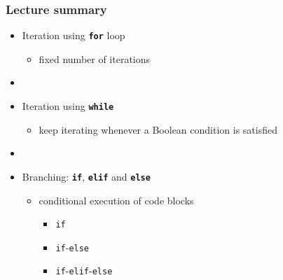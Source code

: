 \documentclass[english,14pt]{beamer}
\begin{document}
\begin{frame}[fragile]

\frametitle{Lecture summary}
\begin{itemize}
	\item Iteration using \textbf{\texttt{for}} loop
	\begin{itemize}
		\item fixed number of iterations
	\end{itemize}

	\item[]
	
	\item Iteration using \textbf{\texttt{while}}
		\begin{itemize}
			\item keep iterating whenever a Boolean condition is satisfied
		\end{itemize}

	\item[]
	
	\item Branching: \textbf{\texttt{if}}, \textbf{\texttt{elif}} and \textbf{\texttt{else}}
		\begin{itemize}
			\item conditional execution of code blocks
			\begin{itemize}
				\item \texttt{if}
				\item \texttt{if}-\texttt{else}
				\item \texttt{if}-\texttt{elif}-\texttt{else}
			\end{itemize}
		\end{itemize}
		
\end{itemize}

\end{frame}
\end{document}
